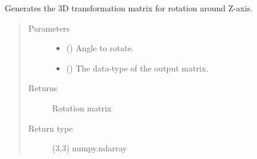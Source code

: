 \documentclass[letterpaper,10pt,english]{sphinxmanual}
\begin{document}
\begin{fulllineitems}
\label{\detokenize{modules/dpt_tools:dpt_tools.rot_mat_z}}
Generates the 3D transformation matrix for rotation around Z-axis.
\begin{quote}\begin{description}
\item[{Parameters}] \leavevmode\begin{itemize}
\item {} 
 () \textendash{} Angle to rotate.

\item {} 
 () \textendash{} The data-type of the output matrix.

\end{itemize}

\item[{Returns}] \leavevmode
Rotation matrix

\item[{Return type}] \leavevmode
(3,3) numpy.ndarray

\end{description}\end{quote}

\end{fulllineitems}

\end{document}
